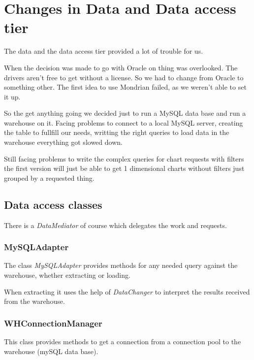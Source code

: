 \section{Changes in Data and Data access tier}


The data and the data access tier provided a lot of trouble for us.

When the decision was made to go with Oracle on thing was overlooked. The
drivers aren't free to get without a license. So we had to change from
Oracle to something other. The first idea to use Mondrian failed, as we
weren't able to set it up.

So the get anything going we decided just to run a MySQL data base and 
run a warehouse on it. Facing problems to connect to a local MySQL server,
creating the table to fullfill our needs, writting the right queries to
load data in the warehouse everything got slowed down.

Still facing problems to write the complex queries for chart requests with filters
the first version will just be able to get 1 dimensional charts without filters
just grouped by a requested thing. 
 

\subsection{Data access classes}
There is a \textit{DataMediator} of course which delegates the work and requests.

\subsubsection{MySQLAdapter}
The class \textit{MySQLAdapter} provides methods for any needed query against
the warehouse, whether extracting or loading.

When extracting it uses the help of \textit{DataChanger} to interpret the
results received from the warehouse.

\subsubsection{WHConnectionManager}
This class provides methods to get a connection from a connection pool to
the warehouse (mySQL data base).